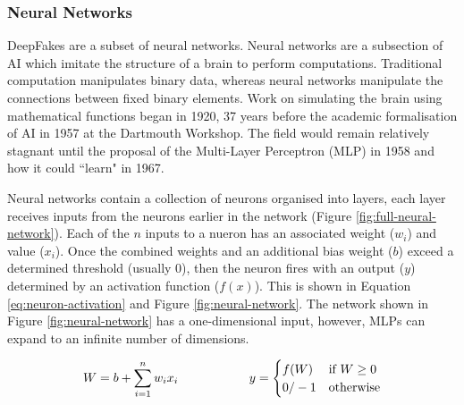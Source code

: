 \subsubsection{Neural Networks}

DeepFakes are a subset of neural networks. Neural networks are a subsection of AI which imitate the structure of a brain to perform computations\cite{islam2019overview}. Traditional computation manipulates binary data, whereas neural networks manipulate the connections between fixed binary elements. Work on simulating the brain using mathematical functions began in 1920\cite{brush1967history}, 37 years before the academic formalisation of AI in 1957 at the Dartmouth Workshop\cite{crevier1993ai}. The field would remain relatively stagnant until the proposal of the Multi-Layer Perceptron (MLP) in 1958\cite{rosenblatt1958perceptron} and how it could ``learn" in 1967\cite{ivakhnenko1967cybernetics}.

Neural networks contain a collection of neurons organised into layers, each layer receives inputs from the neurons earlier in the network (Figure \ref{fig:full-neural-network}). Each of the $n$ inputs to a nueron has an associated weight ($w_i$) and value ($x_i$). Once the combined weights and an additional bias weight ($b$) exceed a determined threshold (usually 0), then the neuron fires with an output ($y$) determined by an activation function ($f(x)$). This is shown in Equation \ref{eq:neuron-activation} and Figure \ref{fig:neural-network}. The network shown in Figure \ref{fig:neural-network} has a one-dimensional input, however, MLPs can expand to an infinite number of dimensions.

\begin{equation}
\label{eq:neuron-activation}
    \begin{array}{c@{\hspace{2cm}}c}
        W = b+\displaystyle\sum_{i=1}^{n} w_ix_i  &
        y = \begin{cases}
            f(W) & \text{if } W \geq 0  \\
            0/-1 & \text{otherwise}
        \end{cases}
    \end{array}
\end{equation}

